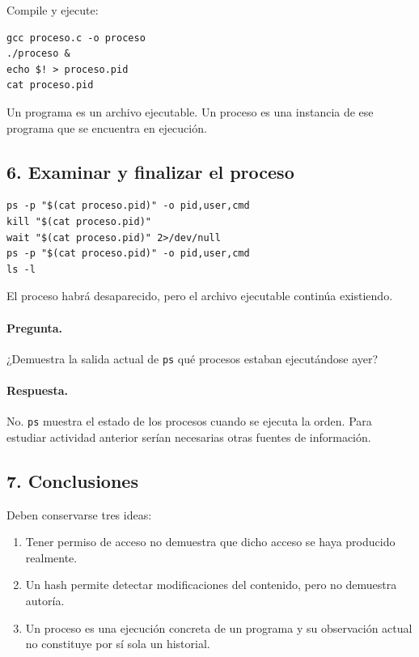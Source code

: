 Compile y ejecute:
\begin{verbatim}
gcc proceso.c -o proceso
./proceso &
echo $! > proceso.pid
cat proceso.pid
\end{verbatim}

Un programa es un archivo ejecutable. Un proceso es una instancia de ese programa que se encuentra en ejecución.

\subsection*{6. Examinar y finalizar el proceso}

\begin{verbatim}
ps -p "$(cat proceso.pid)" -o pid,user,cmd
kill "$(cat proceso.pid)"
wait "$(cat proceso.pid)" 2>/dev/null
ps -p "$(cat proceso.pid)" -o pid,user,cmd
ls -l
\end{verbatim}

El proceso habrá desaparecido, pero el archivo ejecutable continúa existiendo.

\paragraph{Pregunta.}
¿Demuestra la salida actual de \texttt{ps} qué procesos estaban ejecutándose ayer?

\paragraph{Respuesta.}
No. \texttt{ps} muestra el estado de los procesos cuando se ejecuta la orden. Para estudiar actividad anterior serían necesarias otras fuentes de información.

\subsection*{7. Conclusiones}

Deben conservarse tres ideas:
\begin{enumerate}
  \item Tener permiso de acceso no demuestra que dicho acceso se haya producido realmente.
  \item Un hash permite detectar modificaciones del contenido, pero no demuestra autoría.
  \item Un proceso es una ejecución concreta de un programa y su observación actual no constituye por sí sola un historial.
\end{enumerate}

